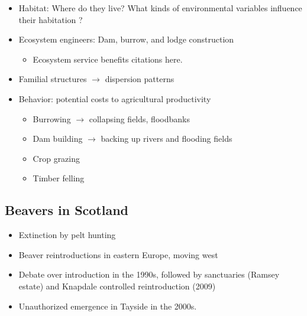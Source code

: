 \begin{itemize}
    \item Habitat: Where do they live? What kinds of environmental variables influence their habitation \parencite{swinnen_environmental_2019}?
    \item Ecosystem engineers: Dam, burrow, and lodge construction
    \begin{itemize}
        \item Ecosystem service benefits citations here.
    \end{itemize}
    \item Familial structures $\rightarrow$ dispersion patterns
    \item Behavior: potential costs to agricultural productivity
    \begin{itemize}
        \item Burrowing $\rightarrow$ collapsing fields, floodbanks
        \item Dam building $\rightarrow$ backing up rivers and flooding fields
        \item Crop grazing
        \item Timber felling
    \end{itemize}
\end{itemize}

\subsection{Beavers in Scotland}

\begin{itemize}
    \item Extinction by pelt hunting
    \item Beaver reintroductions in eastern Europe, moving west
    \item Debate over introduction in the 1990s, followed by sanctuaries (Ramsey estate) and Knapdale controlled reintroduction (2009)
    \item Unauthorized emergence in Tayside in the 2000s.
\end{itemize}